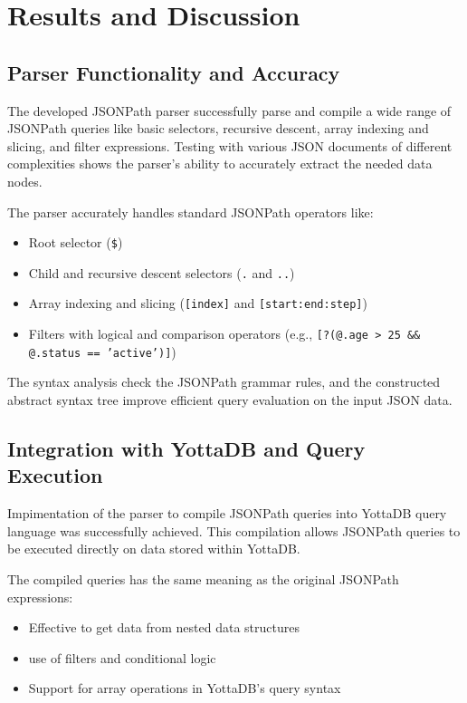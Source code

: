 \chapter{Results and Discussion}

\section{Parser Functionality and Accuracy}

The developed JSONPath parser successfully parse and compile a wide range of JSONPath queries like basic selectors, recursive descent, array indexing and slicing, and filter expressions. Testing with various JSON documents of different complexities shows the parser’s ability to accurately extract the needed data nodes.

The parser accurately handles standard JSONPath operators like:

\begin{itemize}
	\item Root selector (\texttt{\$})
	\item Child and recursive descent selectors (\texttt{.} and \texttt{..})
	\item Array indexing and slicing (\texttt{[index]} and \texttt{[start:end:step]})
	\item Filters with logical and comparison operators (e.g., \texttt{[?(@.age > 25 \&\& @.status == 'active')]})
\end{itemize}

The syntax analysis check the JSONPath grammar rules, and the constructed abstract syntax tree improve efficient query evaluation on the input JSON data.

\section{Integration with YottaDB and Query Execution}

Impimentation of the parser to compile JSONPath queries into YottaDB query language was successfully achieved. This compilation allows JSONPath queries to be executed directly on data stored within YottaDB.

The compiled queries has the same meaning as the original JSONPath expressions:

\begin{itemize}
	\item Effective to get data from nested data structures
	\item use of filters and conditional logic
	\item Support for array operations in YottaDB’s query syntax
\end{itemize}

